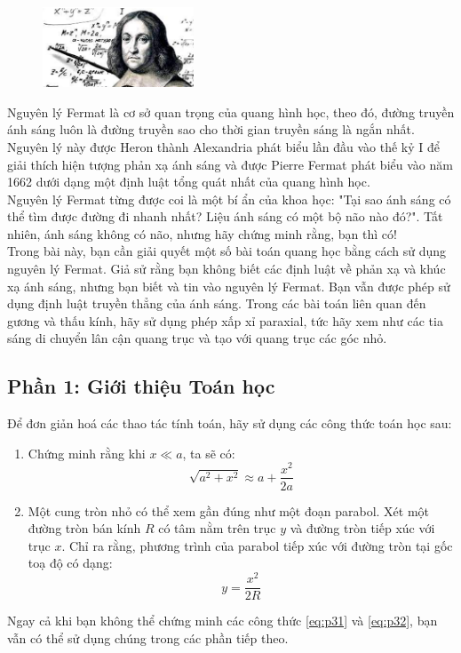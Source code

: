 \begin{figure}
  \centering
  \vspace{-4mm}
  \includegraphics[width=0.4\textwidth]{Figures/P3/Fig 3.1.png}
\end{figure}

\noindent Nguyên lý Fermat là cơ sở quan trọng của quang hình học, theo đó, đường truyền ánh sáng luôn là đường truyền sao cho thời gian truyền sáng là ngắn nhất. Nguyên lý này được Heron thành Alexandria phát biểu lần đầu vào thế kỷ I để giải thích hiện tượng phản xạ ánh sáng và được Pierre Fermat phát biểu vào năm 1662 dưới dạng một định luật tổng quát nhất của quang hình học.\\
\indent Nguyên lý Fermat từng được coi là một bí ẩn của khoa học: "Tại sao ánh sáng có thể tìm được đường đi nhanh nhất? Liệu ánh sáng có một bộ não nào đó?". Tất nhiên, ánh sáng không có não, nhưng hãy chứng minh rằng, bạn thì có!\\
\indent Trong bài này, bạn cần giải quyết một số bài toán quang học bằng cách sử dụng nguyên lý Fermat. Giả sử rằng bạn không biết các định luật về phản xạ và khúc xạ ánh sáng, nhưng bạn biết và tin vào nguyên lý Fermat. Bạn vẫn được phép sử dụng định luật truyền thẳng của ánh sáng. Trong các bài toán liên quan đến gương và thấu kính, hãy sử dụng phép xấp xỉ paraxial, tức hãy xem như các tia sáng di chuyển lân cận quang trục và tạo với quang trục các góc nhỏ.
\subsection*{Phần 1: Giới thiệu Toán học}
\noindent Để đơn giản hoá các thao tác tính toán, hãy sử dụng các công thức toán học sau:
\begin{enumerate}
  \item Chứng minh rằng khi $x\ll a$, ta sẽ có:
        \begin{equation}
          \label{eq:p31}
          \sqrt{a^{2}+x^{2}}\approx a+\frac{x^{2}}{2a}
        \end{equation}
  \item Một cung tròn nhỏ có thể xem gần đúng như một đoạn parabol. Xét một đường tròn bán kính $R$ có tâm nằm trên trục $y$ và đường tròn tiếp xúc với trục $x$. Chỉ ra rằng, phương trình của parabol tiếp xúc với đường tròn tại gốc toạ độ có dạng:
        \begin{equation}
          \label{eq:p32}
          y=\frac{x^{2}}{2R}
        \end{equation}
\end{enumerate}
Ngay cả khi bạn không thể chứng minh các công thức \eqref{eq:p31} và \eqref{eq:p32}, bạn vẫn có thể sử dụng chúng trong các phần tiếp theo.

